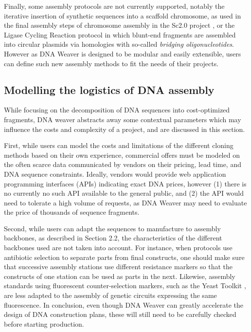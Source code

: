 Finally, some assembly protocols are not currently supported, notably the iterative insertion of synthetic sequences into a scaffold chromosome, as used in the final assembly steps of chromosome assembly in the Sc2.0 project \citep{Richardson2017}, or the Ligase Cycling Reaction protocol \citep{Casini2015, Schlichting2019} in which blunt-end fragments are assembled into circular plasmids via homologies with so-called \textit{bridging oligonucleotides}. However as DNA Weaver is designed to be modular and easily extensible, users can define such new assembly methods to fit the needs of their projects.


\subsection{Modelling the logistics of DNA assembly}

While focusing on the decomposition of DNA sequences into cost-optimized fragments, DNA weaver abstracts away some contextual parameters which may influence the costs and complexity of a project, and are discussed in this section.


First, while users can model the costs and limitations of the different cloning methods based on their own experience, commercial offers must be modeled on the often scarce data communicated by vendors on their pricing, lead time, and DNA sequence constraints. Ideally, vendors would provide web application programming interfaces (APIs) indicating exact DNA prices, however (1) there is no currently no such API available to the general public, and (2) the API would need to tolerate a high volume of requests, as DNA Weaver may need to evaluate the price of thousands of sequence fragments.

Second, while users can adapt the sequences to manufacture to assembly backbones, as described in Section 2.2, the characteristics of the different backbones used are not taken into account. For instance, when protocols use antibiotic selection to separate parts from final constructs, one should make sure that successive assembly stations use different resistance markers so that the constructs of one station can be used as parts in the next. Likewise, assembly standards using fluorescent counter-selection markers, such as the Yeast Toolkit \citep{Lee2015}, are less adapted to the assembly of genetic circuits expressing the same fluorescence. In conclusion, even though DNA Weaver can greatly accelerate the design of DNA construction plans, these will still need to be carefully checked before starting production.


